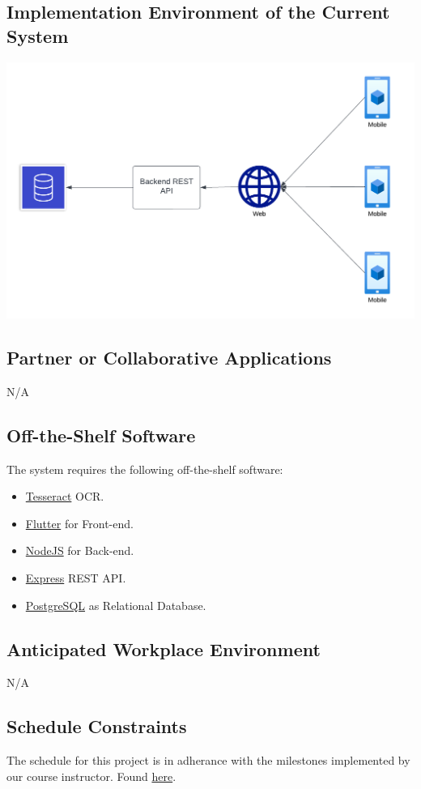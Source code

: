 \documentclass[12pt]{article}
\begin{document}
\subsection{Implementation Environment of the Current System}
\includegraphics[width=\textwidth]{ImplementationEnvironment.png}

\subsection{Partner or Collaborative Applications}
N/A
\subsection{Off-the-Shelf Software}
The system requires the following off-the-shelf software:
\begin{itemize}
  \item \href{https://github.com/tesseract-ocr/tesseract}{Tesseract} OCR.
  \item \href{https://flutter.dev/}{Flutter} for Front-end.
  \item \href{https://nodejs.org/en}{NodeJS} for Back-end.
  \item \href{https://www.npmjs.com/package/express}{Express} REST API.
  \item \href{https://www.postgresql.org/}{PostgreSQL} as Relational Database.
\end{itemize}

\subsection{Anticipated Workplace Environment}
N/A
\subsection{Schedule Constraints}
The schedule for this project is in adherance with the milestones implemented by our course instructor. Found \href{https://gitlab.cas.mcmaster.ca/courses/capstone/-/blob/main/CourseOutline/Capstone_Outline.pdf}{here}.
\end{document}
